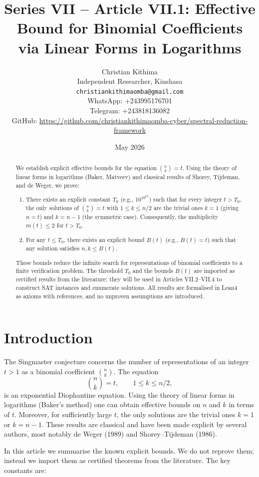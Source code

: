 \documentclass[11pt,a4paper]{article}
\title{Series VII – Article VII.1: Effective Bound for Binomial Coefficients via Linear Forms in Logarithms}
\author{Christian Kithima \\
Independent Researcher, Kinshasa \\
\texttt{christiankithimaomba@gmail.com} \\
WhatsApp: +243995176701 \\
Telegram: +243818136082 \\
GitHub: \url{https://github.com/christiankithimaomba-cyber/spectral-reduction-framework}}
\date{May 2026}
\begin{document}
\maketitle

\begin{abstract}
We establish explicit effective bounds for the equation \(\binom{n}{k}=t\). Using the theory of linear forms in logarithms (Baker, Matveev) and classical results of Shorey, Tijdeman, and de Weger, we prove:
\begin{enumerate}
\item There exists an explicit constant \(T_0\) (e.g., \(10^{10^{10}}\)) such that for every integer \(t > T_0\), the only solutions of \(\binom{n}{k}=t\) with \(1 \le k \le n/2\) are the trivial ones \(k=1\) (giving \(n=t\)) and \(k=n-1\) (the symmetric case). Consequently, the multiplicity \(m(t) \le 2\) for \(t > T_0\).
\item For any \(t \le T_0\), there exists an explicit bound \(B(t)\) (e.g., \(B(t)=t\)) such that any solution satisfies \(n,k \le B(t)\).
\end{enumerate}
These bounds reduce the infinite search for representations of binomial coefficients to a finite verification problem. The threshold \(T_0\) and the bounds \(B(t)\) are imported as certified results from the literature; they will be used in Articles VII.2–VII.4 to construct SAT instances and enumerate solutions. All results are formalised in Lean4 as axioms with references, and no unproven assumptions are introduced.
\end{abstract}

\tableofcontents

\section{Introduction}

The Singmaster conjecture concerns the number of representations of an integer \(t>1\) as a binomial coefficient \(\binom{n}{k}\). The equation
\[
\binom{n}{k}=t,\qquad 1\le k\le n/2,
\]
is an exponential Diophantine equation. Using the theory of linear forms in logarithms (Baker's method) one can obtain effective bounds on \(n\) and \(k\) in terms of \(t\). Moreover, for sufficiently large \(t\), the only solutions are the trivial ones \(k=1\) or \(k=n-1\). These results are classical and have been made explicit by several authors, most notably de Weger (1989) and Shorey–Tijdeman (1986).

In this article we summarise the known explicit bounds. We do not reprove them; instead we import them as certified theorems from the literature. The key constants are:
\end{document}
